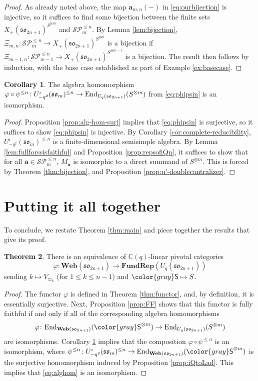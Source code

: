 \documentclass[10pt]{amsart}
\newcommand{\gray}[1]{{\color{gray}#1}}
\numberwithin{equation}{section}
\theoremstyle{definition}
\newtheorem{thm}{Theorem}[section]
\newtheorem{cor}[thm]{Corollary}
\newcommand{\End}{{\rm End}}
\renewcommand{\to}{\rightarrow}
\def\C{{\mathbb C}}
\newcommand{\son}[1][2n+1]{\mathfrak{so}_{#1}}
\newcommand{\som}[1][m]{\mathfrak{so}_{#1}}
\newcommand{\FRep}{\mathbf{FundRep}}
\newcommand{\Web}{\mathbf{Web}}
\newcommand{\iqUsom}[1][m]{{U}^{\iota}_{-q^2}(\som[#1])}
\newcommand{\gS}{\gray{\mathsf{S}}}
\newcommand{\ab}{\mathbf{a}}
\newcommand{\SP}{\mathcal{SP}}
\begin{document}
\begin{proof}
As already noted above, the map $\ab_{m,n}(-)$ in \eqref{eq:ourbijection} is injective, 
so it suffices to find some bijection between 
the finite sets $X_+(\son)^{S^{\otimes m}}$ and $\SP_m^{\le n}$.
By Lemma \ref{lem:bijection}, $\Xi_{m,n} \colon \SP_m^{\le n} \to X_+(\son)^{S^{\otimes m}}$ 
is a bijection if $\Xi_{m-1,n} \colon \SP_{m-1}^{\le n} \to X_+(\son)^{S^{\otimes m-1}}$ is a bijection.
The result then follows by induction, with the base case established as part of Example \ref{ex:basecase}.
	\end{proof}
	
\begin{cor}\label{cor:inj}
The algebra homomorphism 
$\varphi \circ \psi^{\leq n} \colon \iqUsom^{\le n} \rightarrow \End_{U_q(\son)}(S^{\otimes m})$
from \eqref{eq:phipsin} is an isomorphism.
	\end{cor}
\begin{proof}
Proposition \ref{prop:alg-hom-surj} implies that \eqref{eq:phipsin} is surjective, 
so it suffices to show \eqref{eq:phipsin} is injective. 
By Corollary \ref{cor:complete-reducibility}, $\iqUsom^{\le n}$ is a finite-dimensional semisimple algebra. 
By Lemma \ref{lem:fullforssisfaithful} and Proposition \ref{prop:repsofiQn}, 
it suffices to show that for all $\ab\in \SP_{m}^{\le n}$, $M_{\ab}$ is isomorphic to a direct summand of $S^{\otimes m}$. 
This is forced by Theorem \ref{thm:bijection}, and Proposition \ref{prop:u'-doublecantralizer}.
	\end{proof}
		
\section{Putting it all together}

To conclude, we restate Theorem \ref{thm:main} and piece together the results that give its proof.

\begin{thm}
There is an equivalence of $\C(q)$-linear pivotal categories 
\[
\varphi \colon \Web(\son) \to \FRep(U_q(\son))
\]
sending $k \mapsto V_{\varpi_k}$ (for $1 \le k \le n-1$) and $\gS \mapsto S$.
\end{thm}

\begin{proof}
The functor $\varphi$ is defined in Theorem \ref{thm:functor}, and, by definition, 
it is essentially surjective.
Next, Proposition \ref{prop:FF} shows that this functor is fully faithful if and only if 
all of the corresponding algebra homomorphisms
\begin{equation}\label{eq:alghom}
\varphi \colon \End_{\Web(\son)}(\gS^{\otimes m}) \to \End_{U_q(\son)}(S^{\otimes m})
	\end{equation}
are isomorphisms. 
Corollary \ref{cor:inj} implies that the composition $\varphi \circ \psi^{\leq n}$ is an isomorphism, 
where $\psi^{\leq n} \colon \iqUsom^{\le n} \rightarrow \End_{\Web(\son)}(\gS^{\otimes m})$ 
is the surjective homomorphism induced by Proposition \ref{prop:iQtoLad}.
This implies that \eqref{eq:alghom} is an isomorphism.
\end{proof}
\end{document}
